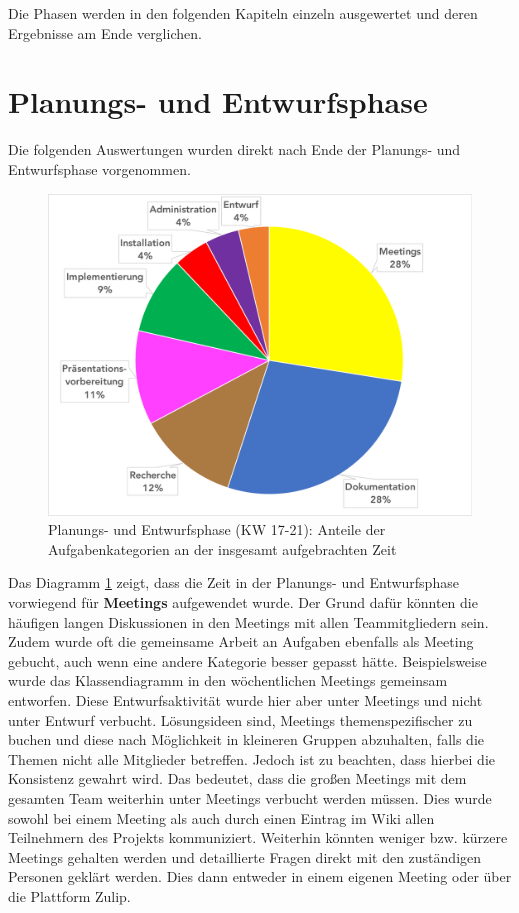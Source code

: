 \documentclass[../review_3.tex]{subfiles}
\begin{document}
Die Phasen werden in den folgenden Kapiteln einzeln ausgewertet und deren Ergebnisse am Ende verglichen.
\section{Planungs- und Entwurfsphase}

Die folgenden Auswertungen wurden direkt nach Ende der Planungs- und Entwurfsphase vorgenommen.

\begin{figure} [h]
    \centering
    \includegraphics[width = 0.8 \linewidth]{img/Kimai1.pdf}
    \caption{Planungs- und Entwurfsphase (KW 17-21): Anteile der Aufgabenkategorien an der insgesamt aufgebrachten Zeit}
    \label{kategorien}
\end{figure}

Das Diagramm \ref{kategorien} zeigt, dass die Zeit in der Planungs- und Entwurfsphase vorwiegend für \textbf{Meetings} aufgewendet wurde. Der Grund dafür könnten die häufigen langen Diskussionen in den Meetings mit allen Teammitgliedern sein. Zudem wurde oft die gemeinsame Arbeit an Aufgaben ebenfalls als Meeting gebucht, auch wenn eine andere Kategorie besser gepasst hätte. Beispielsweise wurde das Klassendiagramm in den wöchentlichen Meetings gemeinsam entworfen. Diese Entwurfsaktivität wurde hier aber unter Meetings und nicht unter Entwurf verbucht. Lösungsideen sind, Meetings themenspezifischer zu buchen und diese nach Möglichkeit in kleineren Gruppen abzuhalten, falls die Themen nicht alle Mitglieder betreffen. Jedoch ist zu beachten, dass hierbei die Konsistenz gewahrt wird. Das bedeutet, dass die \glqq großen\grqq{} Meetings mit dem gesamten Team weiterhin unter Meetings verbucht werden müssen. Dies wurde sowohl bei einem Meeting als auch durch einen Eintrag im Wiki allen Teilnehmern des Projekts kommuniziert. Weiterhin könnten weniger bzw. kürzere Meetings gehalten werden und detaillierte Fragen direkt mit den zuständigen Personen geklärt werden. Dies dann entweder in einem eigenen Meeting oder über die Plattform Zulip.
\end{document}
